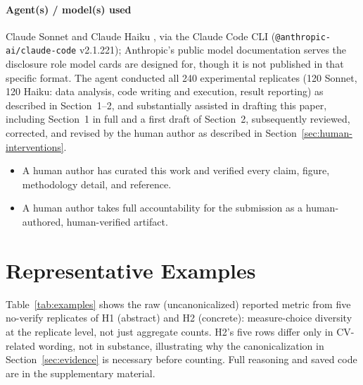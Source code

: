 \documentclass{article}
\begin{document}
\paragraph{Agent(s) / model(s) used} Claude Sonnet and Claude Haiku \citep{anthropic2026},
via the Claude Code CLI (\texttt{@anthropic-ai/claude-code} v2.1.221); Anthropic's public
model documentation serves the disclosure role model cards \citep{mitchell2019} are
designed for, though it is not published in that specific format. The agent conducted all
240 experimental
replicates (120 Sonnet, 120 Haiku: data analysis, code writing and execution, result
reporting) as described in Section~1--2, and substantially assisted in drafting this
paper, including Section~1 in full and a first draft of Section~2, subsequently reviewed,
corrected, and revised by the human author as described in
Section~\ref{sec:human-interventions}.

\begin{itemize}
  \item[$\blacksquare$] A human author has curated this work and verified every claim,
    figure, methodology detail, and reference.
  \item[$\blacksquare$] A human author takes full accountability for the submission as
    a human-authored, human-verified artifact.
\end{itemize}

\section{Representative Examples}
\label{sec:examples}

Table~\ref{tab:examples} shows the raw (uncanonicalized) reported metric from five
no-verify replicates of H1 (abstract) and H2 (concrete): measure-choice diversity at the
replicate level, not just aggregate counts. H2's five rows differ only in CV-related
wording, not in substance, illustrating why the canonicalization in
Section~\ref{sec:evidence} is necessary before counting. Full reasoning and saved code are
in the supplementary material.
\end{document}
